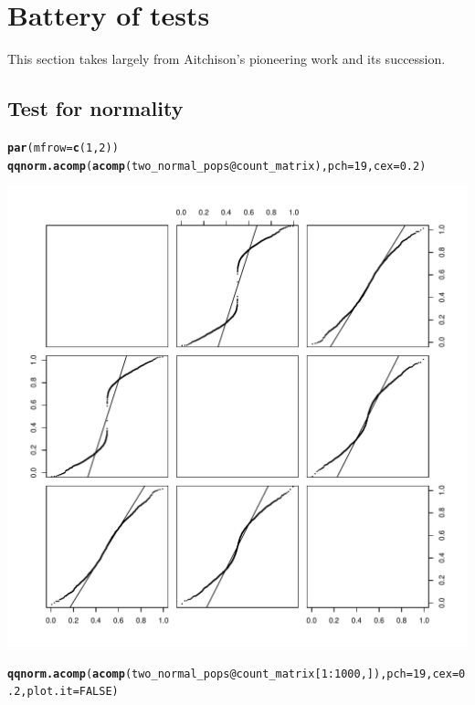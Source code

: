 \documentclass{article}\usepackage[]{graphicx}\usepackage[]{color}
\makeatletter
\def\maxwidth{ %
  \ifdim\Gin@nat@width>\linewidth
    \linewidth
  \else
    \Gin@nat@width
  \fi
}
\newcommand{\hlnum}[1]{\textcolor[rgb]{0.686,0.059,0.569}{#1}}%
\newcommand{\hlopt}[1]{\textcolor[rgb]{0,0,0}{#1}}%
\newcommand{\hlstd}[1]{\textcolor[rgb]{0.345,0.345,0.345}{#1}}%
\newcommand{\hlkwc}[1]{\textcolor[rgb]{0.333,0.667,0.333}{#1}}%
\newcommand{\hlkwd}[1]{\textcolor[rgb]{0.737,0.353,0.396}{\textbf{#1}}}%
\newenvironment{kframe}{%
 \def\at@end@of@kframe{}%
 \ifinner\ifhmode%
  \def\at@end@of@kframe{\end{minipage}}%
  \begin{minipage}{\columnwidth}%
 \fi\fi%
 \def\FrameCommand##1{\hskip\@totalleftmargin \hskip-\fboxsep
 \colorbox{shadecolor}{##1}\hskip-\fboxsep
     \hskip-\linewidth \hskip-\@totalleftmargin \hskip\columnwidth}%
 \MakeFramed {\advance\hsize-\width
   \@totalleftmargin\z@ \linewidth\hsize
   \@setminipage}}%
 {\par\unskip\endMakeFramed%
 \at@end@of@kframe}
\newenvironment{knitrout}{}{} %
\makeatother
\begin{document}
\clearpage
\section{Battery of tests}
This section takes largely from Aitchison's pioneering work\cite{aitchison1982statistical} and its succession\cite{pawlowsky2015modeling}.

\subsection{Test for normality}
\begin{knitrout}
\color{fgcolor}\begin{kframe}
\begin{alltt}
\hlkwd{par}\hlstd{(}\hlkwc{mfrow}\hlstd{=}\hlkwd{c}\hlstd{(}\hlnum{1}\hlstd{,}\hlnum{2}\hlstd{))}
\hlkwd{qqnorm.acomp}\hlstd{(}\hlkwd{acomp}\hlstd{(two_normal_pops}\hlopt{@}\hlkwc{count_matrix}\hlstd{),} \hlkwc{pch}\hlstd{=}\hlnum{19}\hlstd{,} \hlkwc{cex}\hlstd{=}\hlnum{0.2}\hlstd{)}
\end{alltt}
\end{kframe}
\includegraphics[width=\maxwidth]{figure/unnamed-chunk-11-1} 
\begin{kframe}\begin{alltt}
\hlkwd{qqnorm.acomp}\hlstd{(}\hlkwd{acomp}\hlstd{(two_normal_pops}\hlopt{@}\hlkwc{count_matrix}\hlstd{[}\hlnum{1}\hlopt{:}\hlnum{1000}\hlstd{,]),} \hlkwc{pch}\hlstd{=}\hlnum{19}\hlstd{,} \hlkwc{cex}\hlstd{=}\hlnum{0.2}\hlstd{,} \hlkwc{plot.it}\hlstd{=}\hlnum{FALSE}\hlstd{)}
\end{alltt}



\end{kframe}
\end{knitrout}
\end{document}
